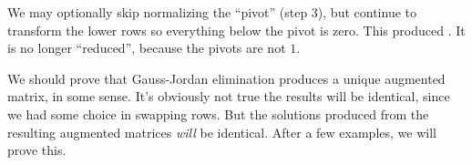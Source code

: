 \begin{remark}
We may optionally skip normalizing the ``pivot'' (step 3), but continue
to transform the lower rows so everything below the pivot is zero. This
produced . It is no longer ``reduced'', because
the pivots are not $1$.
\end{remark}

\begin{remark}
We should prove that Gauss-Jordan elimination produces a unique
augmented matrix, in some sense. It's obviously not true the results
will be identical, since we had some choice in swapping rows. But the
solutions produced from the resulting augmented matrices \emph{will} be
identical. After a few examples, we will prove this.
\end{remark}

